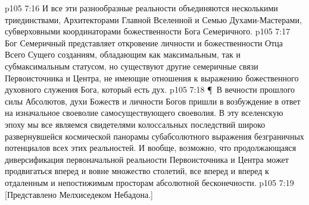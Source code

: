 \vs p105 7:16 И все эти разнообразные реальности объединяются  несколькими триединствами,  Архитекторами Главной Вселенной и  Семью Духами\hyp{}Мастерами, субверховными координаторами божественности Бога Семеричного.
\vs p105 7:17 Бог Семеричный представляет откровение личности и божественности Отца Всего Сущего созданиям, обладающим как максимальным, так и субмаксимальным статусом, но существуют другие семеричные связи Первоисточника и Центра, не имеющие отношения к выражению божественного духовного служения Бога, который есть дух.
\vs p105 7:18 \P\ В вечности прошлого силы Абсолютов, духи Божеств и личности Богов пришли в возбуждение в ответ на изначальное своеволие самосуществующего своеволия. В эту вселенскую эпоху мы все являемся свидетелями колоссальных последствий широко развернувшейся космической панорамы субабсолютного выражения безграничных потенциалов всех этих реальностей. И вообще, возможно, что продолжающаяся диверсификация первоначальной реальности Первоисточника и Центра может продвигаться вперед и вовне множество столетий, все вперед и вперед к отдаленным и непостижимым просторам абсолютной бесконечности.
\vs p105 7:19 [Представлено Мелхиседеком Небадона.]
